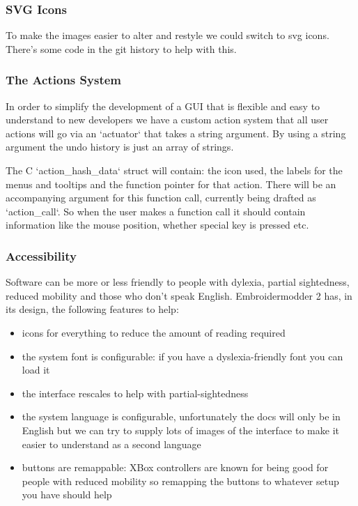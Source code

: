 \documentclass[a4paper, 11pt]{report}
\begin{document}
\subsubsection{SVG Icons}

To make the images easier to alter and restyle we could
switch to svg icons. There's some code in the git history
to help with this.

\subsubsection{The Actions System}

In order to simplify the development of a GUI that is flexible and
easy to understand to new developers we have a custom action system that all
user actions will go via an `actuator` that takes a string argument. By using a
string argument the undo history is just an array of strings.

The C `action\_hash\_data` struct will contain: the icon used, the labels for the
menus and tooltips and the function pointer for that action.
There will be an accompanying argument for this function call, currently being
drafted as `action\_call`. So when the user makes a function call it should
contain information like the mouse position, whether special key is pressed
etc.

\subsubsection{Accessibility}

Software can be more or less friendly to people with dylexia, partial sightedness,
reduced mobility and those who don't speak English.
Embroidermodder 2 has, in its design, the following features to help:

\begin{itemize}
\item icons for everything to reduce the amount of reading required
\item the system font is configurable: if you have a dyslexia-friendly font you can load it
\item the interface rescales to help with partial-sightedness
\item the system language is configurable, unfortunately the docs will only be in English but we can try to supply lots of images of the interface to make it easier to understand as a second language
\item buttons are remappable: XBox controllers are known for being good for people with reduced mobility so remapping the buttons to whatever setup you have should help
\end{itemize}
\end{document}
